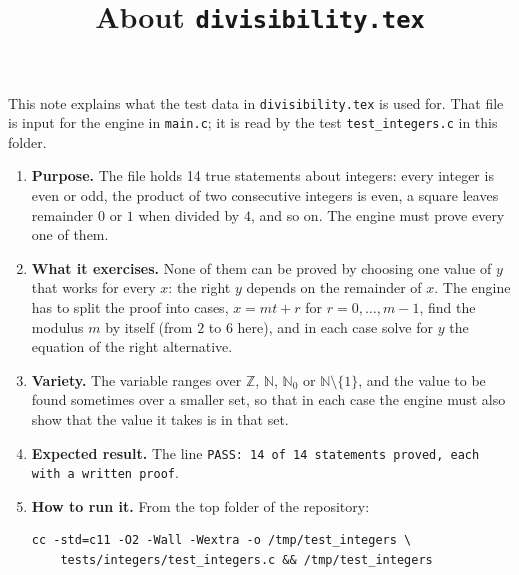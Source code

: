 \documentclass[11pt,a4paper]{article}
\title{About \texttt{divisibility.tex}}
\author{}
\date{}
\begin{document}
\maketitle
This note explains what the test data in \texttt{divisibility.tex} is used for. That file is input for the engine in \texttt{main.c}; it is read by the test \texttt{test\_integers.c} in this folder.

\begin{enumerate}
\item \textbf{Purpose.} The file holds 14 true statements about integers: every integer is even or odd, the product of two consecutive integers is even, a square leaves remainder $0$ or $1$ when divided by $4$, and so on. The engine must prove every one of them.

\item \textbf{What it exercises.} None of them can be proved by choosing one value of $y$ that works for every $x$: the right $y$ depends on the remainder of $x$. The engine has to split the proof into cases, $x = m t + r$ for $r = 0, \ldots, m - 1$, find the modulus $m$ by itself (from $2$ to $6$ here), and in each case solve for $y$ the equation of the right alternative.

\item \textbf{Variety.} The variable ranges over $\mathbb{Z}$, $\mathbb{N}$, $\mathbb{N}_{0}$ or $\mathbb{N} \setminus \{1\}$, and the value to be found sometimes over a smaller set, so that in each case the engine must also show that the value it takes is in that set.

\item \textbf{Expected result.} The line \texttt{PASS: 14 of 14 statements proved, each with a written proof}.

\item \textbf{How to run it.} From the top folder of the repository:
\begin{verbatim}
cc -std=c11 -O2 -Wall -Wextra -o /tmp/test_integers \
    tests/integers/test_integers.c && /tmp/test_integers
\end{verbatim}
\end{enumerate}
\end{document}
